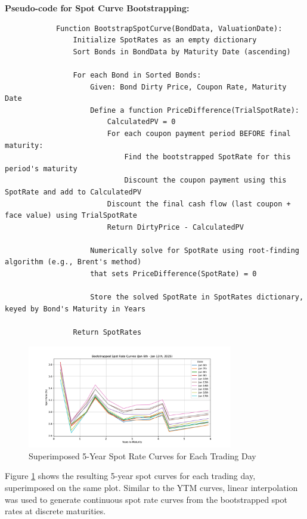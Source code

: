 \documentclass{article}
\begin{document}
\begin{enumerate}
\begin{enumerate}
            \textbf{Pseudo-code for Spot Curve Bootstrapping:}

            \begin{verbatim}
            Function BootstrapSpotCurve(BondData, ValuationDate):
                Initialize SpotRates as an empty dictionary
                Sort Bonds in BondData by Maturity Date (ascending)

                For each Bond in Sorted Bonds:
                    Given: Bond Dirty Price, Coupon Rate, Maturity Date
                    Define a function PriceDifference(TrialSpotRate):
                        CalculatedPV = 0
                        For each coupon payment period BEFORE final maturity:
                            Find the bootstrapped SpotRate for this period's maturity
                            Discount the coupon payment using this SpotRate and add to CalculatedPV
                        Discount the final cash flow (last coupon + face value) using TrialSpotRate
                        Return DirtyPrice - CalculatedPV

                    Numerically solve for SpotRate using root-finding algorithm (e.g., Brent's method)
                    that sets PriceDifference(SpotRate) = 0

                    Store the solved SpotRate in SpotRates dictionary, keyed by Bond's Maturity in Years

                Return SpotRates
            \end{verbatim}

            \begin{figure}[h!]
                \centering
                \includegraphics[width=0.8\textwidth]{spot_curves.pdf} %
                \caption{Superimposed 5-Year Spot Rate Curves for Each Trading Day}
                \label{fig:spot_curves}
            \end{figure}

            Figure \ref{fig:spot_curves} shows the resulting 5-year spot curves for each trading day, superimposed on the same plot. Similar to the YTM curves, linear interpolation was used to generate continuous spot rate curves from the bootstrapped spot rates at discrete maturities.


\end{enumerate}
\end{enumerate}
\end{document}
